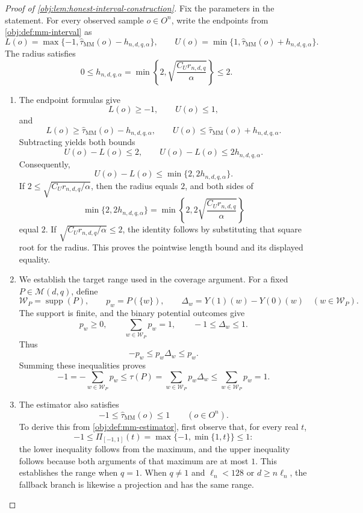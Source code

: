 \documentclass[11pt]{article}
\begin{document}
\begin{proof}[Proof of \cref{obj:lem:honest-interval-construction}]
Fix the parameters in the statement. For every observed sample \(o\in O^n\), write the endpoints from \cref{obj:def:mm-interval} as
\[
L(o)=\max\{-1,\widehat\tau_{\mathrm{MM}}(o)-h_{n,d,q,\alpha}\},
\qquad
U(o)=\min\{1,\widehat\tau_{\mathrm{MM}}(o)+h_{n,d,q,\alpha}\}.
\]
The radius satisfies
\[
0\le h_{n,d,q,\alpha}
=\min\left\{2,\sqrt{\frac{C_Ur_{n,d,q}}{\alpha}}\right\}
\le2.
\]

\begin{enumerate}
\item The endpoint formulas give
\[
L(o)\ge-1,\qquad U(o)\le1,
\]
and
\[
L(o)\ge\widehat\tau_{\mathrm{MM}}(o)-h_{n,d,q,\alpha},
\qquad
U(o)\le\widehat\tau_{\mathrm{MM}}(o)+h_{n,d,q,\alpha}.
\]
Subtracting yields both bounds
\[
U(o)-L(o)\le2,
\qquad
U(o)-L(o)\le2h_{n,d,q,\alpha}.
\]
Consequently,
\[
U(o)-L(o)\le\min\{2,2h_{n,d,q,\alpha}\}.
\]
If \(2\le\sqrt{C_Ur_{n,d,q}/\alpha}\), then the radius equals \(2\), and both sides of
\[
\min\{2,2h_{n,d,q,\alpha}\}
=
\min\left\{2,2\sqrt{\frac{C_Ur_{n,d,q}}{\alpha}}\right\}
\]
equal \(2\). If \(\sqrt{C_Ur_{n,d,q}/\alpha}\le2\), the identity follows by substituting that square root for the radius. This proves the pointwise length bound and its displayed equality.

\item We establish the target range used in the coverage argument. For a fixed \(P\in\mathcal M(d,q)\), define
\[
\mathcal W_P=\operatorname{supp}(P),
\qquad
p_w=P(\{w\}),
\qquad
\Delta_w=Y(1)(w)-Y(0)(w)
\quad(w\in\mathcal W_P).
\]
The support is finite, and the binary potential outcomes give
\[
p_w\ge0,\qquad
\sum_{w\in\mathcal W_P}p_w=1,
\qquad
-1\le\Delta_w\le1.
\]
Thus
\[
-p_w\le p_w\Delta_w\le p_w.
\]
Summing these inequalities proves
\[
-1
=-\sum_{w\in\mathcal W_P}p_w
\le
\tau(P)=\sum_{w\in\mathcal W_P}p_w\Delta_w
\le
\sum_{w\in\mathcal W_P}p_w
=1.
\]

\item The estimator also satisfies
\[
-1\le\widehat\tau_{\mathrm{MM}}(o)\le1
\qquad(o\in O^n).
\]
To derive this from \cref{obj:def:mm-estimator}, first observe that, for every real \(t\),
\[
-1\le\Pi_{[-1,1]}(t)=\max\{-1,\min\{1,t\}\}\le1:
\]
the lower inequality follows from the maximum, and the upper inequality follows because both arguments of that maximum are at most \(1\). This establishes the range when \(q=1\). When \(q\ne1\) and
\(\ell_n<128\) or \(d\ge n\ell_n\), the fallback branch is likewise a projection and has the same range.


\end{enumerate}
\end{proof}
\end{document}
